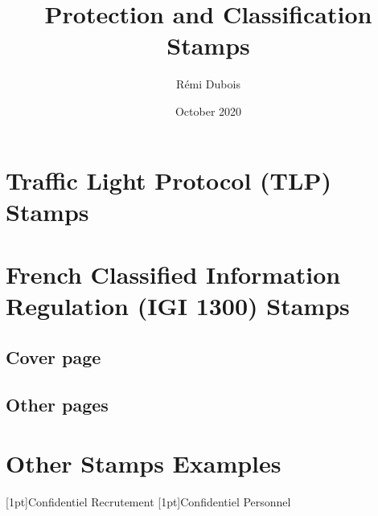 \documentclass{article}
\title{Protection and Classification Stamps}
\author{Rémi Dubois}
\date{October 2020}
\begin{document}
\maketitle

\section{Traffic Light Protocol (TLP) Stamps}

\begin{flushright}
\end{flushright}

\section{French Classified Information Regulation (IGI 1300) Stamps}

\subsection{Cover page}
\begin{center}
    
    
    
    
\end{center}

\subsection{Other pages}


\begin{center}

\end{center}

\section{Other Stamps Examples}

\iscfont{\sffamily}
\begin{center}
[1pt]{Confidentiel Recrutement}
[1pt]{Confidentiel Personnel}
\end{center}
\end{document}
